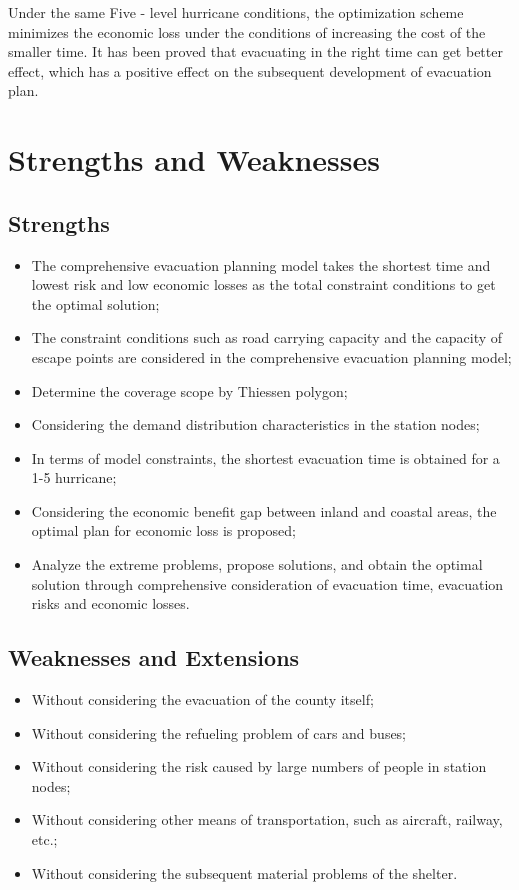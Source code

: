 \documentclass{mcmthesis}
\begin{document}
Under the same Five - level hurricane conditions, the optimization scheme minimizes the economic loss under the conditions of increasing the cost of the smaller time. It has been proved that evacuating in the right time can get better effect, which has a positive effect on the subsequent development of evacuation plan.

\section{Strengths and Weaknesses}

\subsection{Strengths}

\begin{itemize}
  \item The comprehensive evacuation planning model takes the shortest time and lowest risk and low economic losses as the total constraint conditions to get the optimal solution;
  \item The constraint conditions such as road carrying capacity and the capacity of escape points are considered in the comprehensive evacuation planning model;
  \item Determine the coverage scope by Thiessen polygon;
  \item Considering the demand distribution characteristics in the station nodes;
  \item In terms of model constraints, the shortest evacuation time is obtained for a 1-5 hurricane;
  \item Considering the economic benefit gap between inland and coastal areas, the optimal plan for economic loss is proposed;
  \item Analyze the extreme problems, propose solutions, and obtain the optimal solution through comprehensive consideration of evacuation time, evacuation risks and economic losses.
\end{itemize}

\subsection{Weaknesses and Extensions}
\begin{itemize}
  \item Without considering the evacuation of the county itself;
  \item Without considering the refueling problem of cars and buses;
  \item Without considering the risk caused by large numbers of people in station nodes;
  \item Without considering other means of transportation, such as aircraft, railway, etc.;
  \item Without considering the subsequent material problems of the shelter.
\end{itemize}
\end{document}

